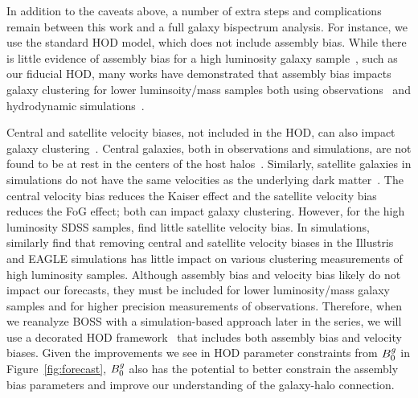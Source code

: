 In addition to the caveats above, a number of extra steps and complications remain
between this work and a full galaxy bispectrum analysis. For instance, we use
the standard \cite{zheng2007} HOD model,
which does not include assembly bias. While there is little evidence of
assembly bias for a high luminosity galaxy 
sample~\citep{zentner2016, vakili2019, beltz-mohrmann2020}, such as our 
fiducial HOD,
many works have demonstrated that assembly bias impacts galaxy
clustering for lower luminsoity/mass samples both using
observations~\citep{pujol2014, hearin2016, pujol2017, zentner2019, vakili2019, obuljen2020}
and hydrodynamic simulations~\citep{chaves-montero2016, beltz-mohrmann2020}. 
 
Central and satellite velocity biases, not included in the
\cite{zheng2007} HOD, can also impact galaxy clustering~\citep{guo2015a,guo2015}. 
Central galaxies, both in observations and simulations, are not found to be 
at rest in the centers of the host 
halos~\citep[\eg][]{berlind2003, yoshikawa2003, vandenbosch2005, skibba2011}. 
Similarly, satellite galaxies in simulations do not have the same velocities as
the underlying dark matter~\citep[\eg][]{diemand2004, gao2004, lau2010,
munari2013, wu2013}. The central velocity bias reduces the Kaiser effect and
the satellite velocity bias reduces the FoG effect; both can impact
galaxy clustering. However, for the high luminosity SDSS samples,
\cite{guo2015} find little satellite velocity bias.
In simulations, \cite{beltz-mohrmann2020} similarly find that removing central and
satellite velocity biases in the Illustris and EAGLE simulations has
little impact on various clustering measurements of high luminosity
samples. Although assembly bias and velocity bias likely do not impact our 
forecasts, they must be included for lower luminosity/mass galaxy samples 
and for higher precision measurements of observations. Therefore, when 
we reanalyze BOSS with a simulation-based approach later in the series,
we will use a decorated HOD framework~\citep[\eg][]{hearin2016, vakili2019,
zhai2019} that includes both assembly bias and velocity biases. 
Given the improvements we see in HOD parameter constraints from $B^g_0$ in
Figure~\ref{fig:forecast}, $B^g_0$ also has the potential to better
constrain the assembly bias parameters and improve our understanding of the 
galaxy-halo connection. 

